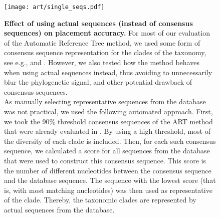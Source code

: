 \begin{figure}[hpbt]
    \centering
    \texttt{[image: art/single\_seqs.pdf]}
    \begin{subfigure}{0pt}
        \label{fig:single_seqs:sub:majorities_edge}
    \end{subfigure}
    \begin{subfigure}{0pt}
        \label{fig:single_seqs:sub:single_seq_edge}
    \end{subfigure}
    \begin{subfigure}{0pt}
        \label{fig:single_seqs:sub:majorities_branch}
    \end{subfigure}
    \begin{subfigure}{0pt}
        \label{fig:single_seqs:sub:single_seq_branch}
    \end{subfigure}
    \caption[Effect of using actual sequences (instead of consensus sequences) on placement accuracy]{
        \textbf{Effect of using actual sequences (instead of consensus sequences) on placement accuracy.}
        For most of our evaluation of the Automatic Reference Tree method,
        we used some form of consensus sequence representation for the clades of the taxonomy,
        see e.g.,  and .
        However, we also tested how the method behaves when using actual sequences instead,
        thus avoiding to unnecessarily blur the phylogenetic signal,
        and other potential drawback of consensus sequences.
        \\
        As manually selecting representative sequences from the database was not practical,
        we used the following automated approach.
        First, we took the 90\% threshold consensus sequences of the ART method
        that were already evaluated in .
        By using a high threshold, most of the diversity of each clade is included.
        Then, for each such consensus sequence,
        we calculated a score for all sequences from the database that were used to construct this consensus sequence.
        This score is the number of different nucleotides between the consensus sequence and the database sequence.
        The sequence with the lowest score (that is, with most matching nucleotides)
        was then used as representative of the clade.
        Thereby, the taxonomic clades are represented by actual sequences from the database.
}
\end{figure}
